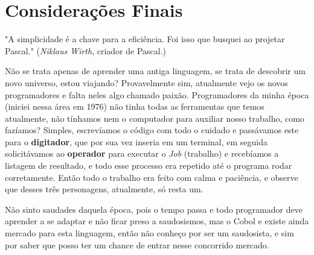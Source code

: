 \documentclass[a4paper,11pt]{book} %
\begin{document}
\pagestyle{empty} %
\tableofcontents %
\cleardoublepage %
\pagestyle{fancy} %
\clearpage %




%
%
%

\appendix
{}
\chapter{Considerações Finais}
\begin{remark}
"A simplicidade é a chave para a eficiência. Foi isso que busquei ao projetar Pascal." (\textit{Niklaus Wirth}, criador de Pascal.)
\end{remark}

Não se trata apenas de aprender uma antiga linguagem, se trata de descobrir um novo universo, estou viajando? Provavelmente sim, atualmente vejo os novos programadores e falta neles algo chamado paixão. Programadores da minha época (iniciei nessa área em 1976) não tinha todas as ferramentas que temos atualmente, não tínhamos nem o computador para auxiliar nosso trabalho, como fazíamos? Simples, escrevíamos o código com todo o cuidado e passávamos este para o \textbf{digitador}, que por sua vez inseria em um terminal, em seguida solicitávamos ao \textbf{operador} para executar o \textit{Job} (trabalho) e recebíamos a listagem de resultado, e todo esse processo era repetido até o programa rodar corretamente. Então todo o trabalho era feito com calma e paciência, e observe que desses três personagens, atualmente, só resta um.

Não sinto saudades daquela época, pois o tempo passa e todo programador deve aprender a se adaptar e não ficar preso a saudosismos, mas o Cobol e existe ainda mercado para esta linguagem, então não conheço por ser um saudosista, e sim por saber que posso ter um chance de entrar nesse concorrido mercado.
\end{document}
